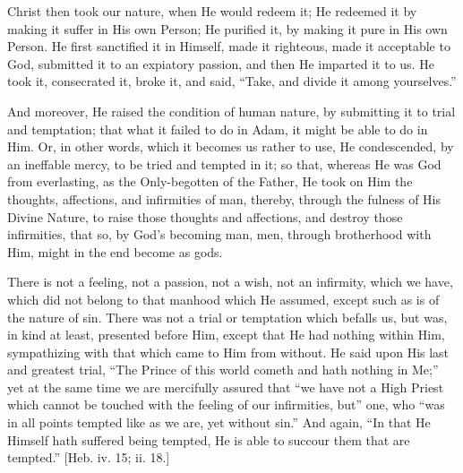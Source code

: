 Christ then took our nature, when He would redeem it; He redeemed
it by making it suffer in His own Person; He purified it, by making it
pure in His own Person. He first sanctified it in Himself, made it
righteous, made it acceptable to God, submitted it to an expiatory
passion, and then He imparted it to us. He took it, consecrated it,
broke it, and said, ``Take, and divide it among yourselves.''

And moreover, He raised the condition of human nature, by
submitting it to trial and temptation; that what it failed to do in
Adam, it might be able to do in Him. Or, in other words, which it
becomes us rather to use, He condescended, by an ineffable mercy, to
be tried and tempted in it; so that, whereas He was God from
everlasting, as the Only-begotten of the Father, He took on Him the
thoughts, affections, and infirmities of man, thereby, through the
fulness of His Divine Nature, to raise those thoughts and affections,
and destroy those infirmities, that so, by God's becoming man, men,
through brotherhood with Him, might in the end become as gods.

There is not a feeling, not a passion, not a wish, not an
infirmity, which we have, which did not belong to that manhood which
He assumed, except such as is of the nature of sin. There was not a
trial or temptation which befalls us, but was, in kind at least,
presented before Him, except that He had nothing within Him,
sympathizing with that which came to Him from without. He said upon
His last and greatest trial, ``The Prince of this world cometh and
hath nothing in Me;'' yet at the same time we are mercifully
assured that ``we have not a High Priest which cannot be touched
with the feeling of our infirmities, but'' one, who ``was in
all points tempted like as we are, yet without sin.'' And again,
``In that He Himself hath suffered being tempted, He is able to
succour them that are tempted.'' [Heb. iv. 15; ii. 18.]

